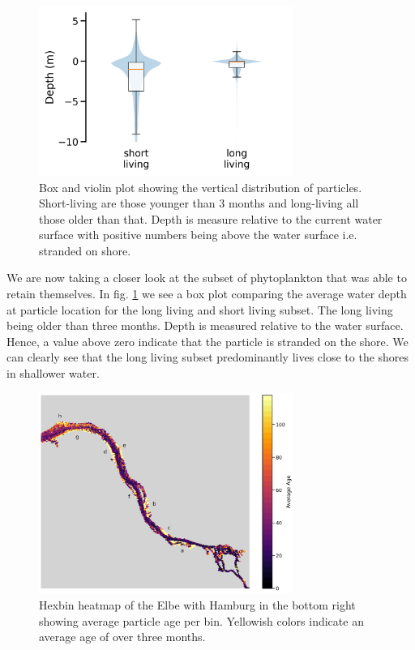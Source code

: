 \documentclass[npg, manuscript]{copernicus}
\begin{document}
\begin{figure}
    \includegraphics[width=8.3cm]{figures/retention_boxplot.png}
    \caption[]{Box and violin plot showing the vertical distribution of particles.  Short-living are those younger than 3 months and long-living all those older than that. Depth is measure relative to the current water surface with positive numbers being above the water surface i.e. stranded on shore.}
    \label{fig:migration-long-vs-short}
\end{figure}

We are now taking a closer look at the subset of phytoplankton that was able to retain themselves.
In fig. \ref{fig:migration-long-vs-short} we see a box plot comparing the average water depth at particle location for the long living and short living subset. The long living being older than three months.
Depth is measured relative to the water surface. Hence, a value above zero indicate that the particle is stranded on the shore.
We can clearly see that the long living subset predominantly lives close to the shores in shallower water.

\begin{figure}
    \includegraphics[width=8.3cm]{figures/age_hexbin.png}
    \caption[]{Hexbin heatmap of the Elbe with Hamburg in the bottom right showing average particle age per bin.  Yellowish colors indicate an average age of over three months.}
    \label{fig:migration-long-vs-short-heatmap}
\end{figure}
\end{document}
